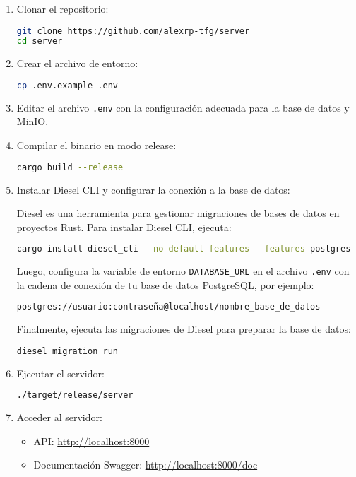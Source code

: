 \begin{enumerate}
    \item Clonar el repositorio:
\begin{lstlisting}[language=bash]
git clone https://github.com/alexrp-tfg/server
cd server
\end{lstlisting}

    \item Crear el archivo de entorno:
\begin{lstlisting}[language=bash]
cp .env.example .env
\end{lstlisting}

    \item Editar el archivo \texttt{.env} con la configuración adecuada para la base de datos y MinIO.

    \item Compilar el binario en modo release:
\begin{lstlisting}[language=bash]
cargo build --release
\end{lstlisting}

    \item Instalar Diesel CLI y configurar la conexión a la base de datos:

        Diesel es una herramienta para gestionar migraciones de bases de datos en proyectos Rust. Para instalar Diesel CLI, ejecuta:

\begin{lstlisting}[language=bash]
cargo install diesel_cli --no-default-features --features postgres
\end{lstlisting}

        Luego, configura la variable de entorno \texttt{DATABASE\_URL} en el archivo \texttt{.env} con la cadena de conexión de tu base de datos PostgreSQL, por ejemplo:

\begin{lstlisting}[language=bash]
postgres://usuario:contraseña@localhost/nombre_base_de_datos
\end{lstlisting}

        Finalmente, ejecuta las migraciones de Diesel para preparar la base de datos:

\begin{lstlisting}[language=bash]
diesel migration run
\end{lstlisting}

    \item Ejecutar el servidor:
\begin{lstlisting}[language=bash]
./target/release/server
\end{lstlisting}

    \item Acceder al servidor:
        \begin{itemize}
            \item API: \url{http://localhost:8000}
            \item Documentación Swagger: \url{http://localhost:8000/doc}
        \end{itemize}
\end{enumerate}

